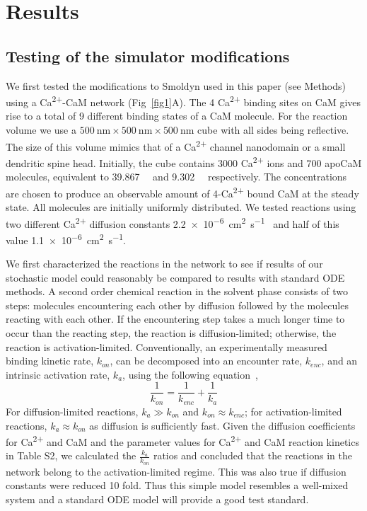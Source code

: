 \documentclass[10pt,letterpaper]{article}
\begin{document}
\section*{Results}
\subsection*{Testing of the simulator modifications}
We first tested the modifications to Smoldyn used in this paper (see Methods) using a Ca\textsuperscript{2+}-CaM network (Fig~\ref{fig1}A). The 4 Ca\textsuperscript{2+} binding sites on CaM gives rise to a total of 9 different binding states of a CaM molecule. For the reaction volume we use a $\SI{500}{\nm}\times\SI{500}{\nm}\times\SI{500}{\nm}$ cube with all sides being reflective. The size of this volume mimics that of a Ca\textsuperscript{2+} channel nanodomain or a small dendritic spine head. Initially, the cube contains 3000 Ca\textsuperscript{2+} ions and 700 apoCaM molecules, equivalent to \SI{39.867}{\micro\Molar} and \SI{9.302}{\micro\Molar} respectively. The concentrations are chosen to produce an observable amount of 4-Ca\textsuperscript{2+} bound CaM at the steady state. All molecules are initially uniformly distributed. We tested reactions using two different Ca\textsuperscript{2+} diffusion constants \SI{2.2e-6}{\square\cm\per\s}~\cite{Keller:2008ez} and half of this value \SI{1.1e-6}{\square\cm\per\s}.

We first characterized the reactions in the network to see if results of our stochastic model could reasonably be compared to results with standard ODE methods. A second order chemical reaction in the solvent phase consists of two steps: molecules encountering each other by diffusion followed by the molecules reacting with each other. If the encountering step takes a much longer time to occur than the reacting step, the reaction is diffusion-limited; otherwise, the reaction is activation-limited. Conventionally, an experimentally measured binding kinetic rate, $k_{on}$, can be decomposed into an encounter rate, $k_{enc}$, and an intrinsic activation rate, $k_{a}$, using the following equation~\cite{Bamford198505},
\begin{equation}\frac{1}{k_{on}}=\frac{1}{k_{enc}}+\frac{1}{k_a}\end{equation}
For diffusion-limited reactions, $k_a \gg k_{on}$ and $k_{on} \approx k_{enc}$; for activation-limited reactions, $k_a \approx k_{on}$ as diffusion is sufficiently fast. Given the diffusion coefficients for Ca\textsuperscript{2+} and CaM and the parameter values for Ca\textsuperscript{2+} and CaM reaction kinetics in Table S2, we calculated the $\frac{k_a}{k_{on}}$ ratios and concluded that the reactions in the network belong to the activation-limited regime. This was also true if diffusion constants were reduced 10 fold. Thus this simple model resembles a well-mixed system and a standard ODE model will provide a good test standard. 
\end{document}
